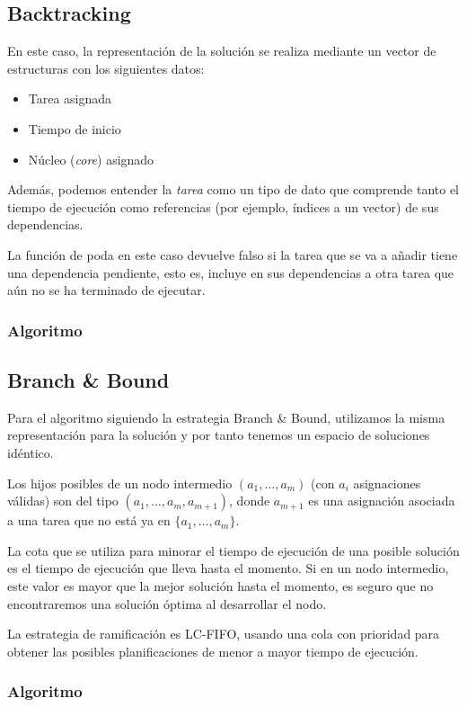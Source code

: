 \documentclass[a4paper, 11pt]{article} %
\begin{document}
  
  \subsection{Backtracking}
  En este caso, la representación de la solución se realiza mediante un vector de estructuras con los siguientes datos:
  \begin{itemize}
  \item Tarea asignada
  \item Tiempo de inicio
  \item Núcleo (\textit{core}) asignado
  \end{itemize}
  Además, podemos entender la \textit{tarea} como un tipo de dato que comprende tanto el tiempo de ejecución como referencias (por ejemplo, índices a un vector) de sus dependencias.
  
  La función de poda en este caso devuelve falso si la tarea que se va a añadir tiene una dependencia pendiente, esto es, incluye en sus dependencias a otra tarea que aún no se ha terminado de ejecutar.
  
  \subsubsection{Algoritmo}
  
  \subsection{Branch \& Bound}
  Para el algoritmo siguiendo la estrategia Branch \& Bound, utilizamos la misma representación para la solución y por tanto tenemos un espacio de soluciones idéntico.
  
  Los hijos posibles de un nodo intermedio $(a_1, \dots, a_m)$ (con $a_i$ asignaciones válidas) son del tipo $(a_1, \dots, a_m, a_{m+1})$, donde $a_{m+1}$ es una asignación asociada a una tarea que no está ya en $\{a_1, \dots, a_m\}$.
  
  La cota que se utiliza para minorar el tiempo de ejecución de una posible solución es el tiempo de ejecución que lleva hasta el momento. Si en un nodo intermedio, este valor es mayor que la mejor solución hasta el momento, es seguro que no encontraremos una solución óptima al desarrollar el nodo.
  
  La estrategia de ramificación es LC-FIFO, usando una cola con prioridad para obtener las posibles planificaciones de menor a mayor tiempo de ejecución.
  
  \subsubsection{Algoritmo}
\end{document}
